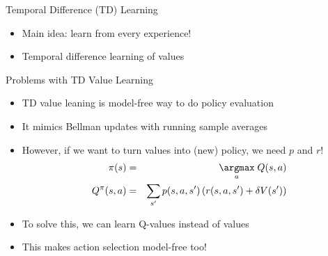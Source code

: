 \documentclass[11pt,aspectratio=169,handout]{beamer}
\begin{document}
  
  \begin{frame}{Temporal Difference (TD) Learning}
   \begin{itemize}[<+->]
   \setlength{\itemsep}{0.7em}
    \item Main idea: learn from every experience!
    \item Temporal difference learning of values
   \end{itemize}
  \end{frame}
  
  
  \begin{frame}{Problems with TD Value Learning}
   \begin{itemize}
   \setlength{\itemsep}{1em}
    \item TD value leaning is model-free way to do policy evaluation
    \item It mimics Bellman updates with running sample averages
    \item However, if we want to turn values into (new) policy, we need $p$ and $r$!
    \begin{eqnarray*}    
     \pi(s) & = &\underset{a}{\argmax} \; Q(s, a)\\
     Q^\pi(s,a) & = &\sum_{s^\prime}p(s, a, s^\prime) \left(r(s, a, s^\prime) + \delta V(s^\prime)\right)
    \end{eqnarray*}
    \item To solve this, we can learn Q-values instead of values
    \item This makes action selection model-free too!
   \end{itemize}
  \end{frame}
  
\end{document}
